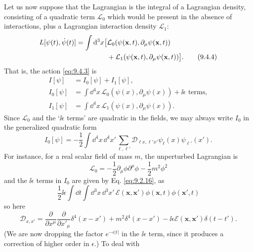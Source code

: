 Let us now suppose that the Lagrangian is the integral of a Lagrangian density,
consisting of a quadratic term $\mathcal L_0$ which would be present in the
absence of interactions, plus a Lagrangian interaction density $\mathcal L_1$:
\begin{align}
L[\psi(t),\dot\psi(t)]=\int \mathop{}\!\mathrm{d}^3x\bigl[&
 \mathcal L_0(\psi(\mathbf{x},t),\partial_\mu\psi(\mathbf{x},t))
\notag\\
&+\mathcal L_1(\psi(\mathbf{x},t),\partial_\mu\psi(\mathbf{x},t))\bigr].
\tag{9.4.4}\label{eq:9.4.4}
\end{align}
That is, the action \eqref{eq:9.4.3} is
\begin{align}
I[\psi]&=I_0[\psi]+I_1[\psi],
\tag{9.4.5}\label{eq:9.4.5}\\
I_0[\psi]&=\int \dd^4x\,
 \mathcal L_0(\psi(x),\partial_\mu\psi(x))+\ii\epsilon\text{ terms},
\tag{9.4.6}\label{eq:9.4.6}\\
I_1[\psi]&=\int \dd^4x\,
 \mathcal L_1(\psi(x),\partial_\mu\psi(x)).
\tag{9.4.7}\label{eq:9.4.7}
\end{align}
Since $\mathcal L_0$ and the `$\ii\epsilon$ terms' are quadratic in the fields,
we may always write $I_0$ in the generalized quadratic form
\begin{equation}
I_0[\psi]=-\frac12\int \dd^4x\,\dd^4x'\sum_{\ell,\ell'}
 \mathcal D_{\ell x,\ell'x'}\psi_\ell(x)\psi_{\ell'}(x').
\tag{9.4.8}\label{eq:9.4.8}
\end{equation}
For instance, for a real scalar field of mass $m$, the unperturbed Lagrangian
is
\begin{equation}
\mathcal L_0=-\frac12\partial_\mu\phi\partial^\mu\phi
 -\frac12m^2\phi^2
\tag{9.4.9}\label{eq:9.4.9}
\end{equation}
and the $\ii\epsilon$ terms in $I_0$ are given by Eq. \eqref{eq:9.2.16}, as
\begin{equation}
\frac12\ii\epsilon\int \dd t\int \dd^3x\,\dd^3x'\,
 \mathcal E(\mathbf{x},\mathbf{x}')\phi(\mathbf{x},t)\phi(\mathbf{x}',t)
\tag{9.4.10}\label{eq:9.4.10}
\end{equation}
so here
\begin{equation}
\mathcal D_{x,x'}=
 \frac{\partial}{\partial x^\mu}\frac{\partial}{\partial x'_\mu}
 \delta^4(x-x')+m^2\delta^4(x-x')
 -\ii\epsilon\mathcal E(\mathbf{x},\mathbf{x}')\delta(t-t').
\tag{9.4.11}\label{eq:9.4.11}
\end{equation}
(We are now dropping the factor $e^{-\epsilon|t|}$ in the $\ii\epsilon$ term,
since it produces a correction of higher order in $\epsilon$.) To deal with
